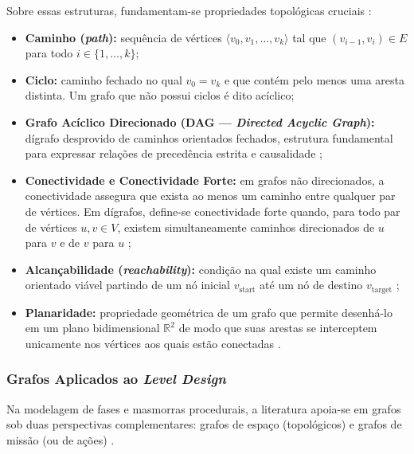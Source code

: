 Sobre essas estruturas, fundamentam-se propriedades topológicas cruciais \cite{cormen2009introduction, linden2014dungeons, summerville2018procedural}:
\begin{itemize}
    \item \textbf{Caminho (\textit{path}):} sequência de vértices $\langle v_0, v_1, \dots, v_k \rangle$ tal que $(v_{i-1}, v_i) \in E$ para todo $i \in \{1, \dots, k\}$;
    \item \textbf{Ciclo:} caminho fechado no qual $v_0 = v_k$ e que contém pelo menos uma aresta distinta. Um grafo que não possui ciclos é dito acíclico;
    \item \textbf{Grafo Acíclico Direcionado (DAG --- \textit{Directed Acyclic Graph}):} dígrafo desprovido de caminhos orientados fechados, estrutura fundamental para expressar relações de precedência estrita e causalidade \cite{cormen2009introduction, wang2026designerlyloop};
    \item \textbf{Conectividade e Conectividade Forte:} em grafos não direcionados, a conectividade assegura que exista ao menos um caminho entre qualquer par de vértices. Em dígrafos, define-se conectividade forte quando, para todo par de vértices $u, v \in V$, existem simultaneamente caminhos direcionados de $u$ para $v$ e de $v$ para $u$ \cite{cormen2009introduction};
    \item \textbf{Alcançabilidade (\textit{reachability}):} condição na qual existe um caminho orientado viável partindo de um nó inicial $v_{\text{start}}$ até um nó de destino $v_{\text{target}}$ \cite{cormen2009introduction, xu2025databasedrivenframework3dlevel};
    \item \textbf{Planaridade:} propriedade geométrica de um grafo que permite desenhá-lo em um plano bidimensional $\mathbb{R}^2$ de modo que suas arestas se interceptem unicamente nos vértices aos quais estão conectadas \cite{cormen2009introduction, linden2013designing}.
\end{itemize}

\subsubsection{Grafos Aplicados ao \textit{Level Design}}
\label{sec:grafos_level_design}

Na modelagem de fases e masmorras procedurais, a literatura apoia-se em grafos sob duas perspectivas complementares: grafos de espaço (topológicos) e grafos de missão (ou de ações) \cite{dormans2010, linden2013designing, linden2014dungeons, summerville2018procedural}.

